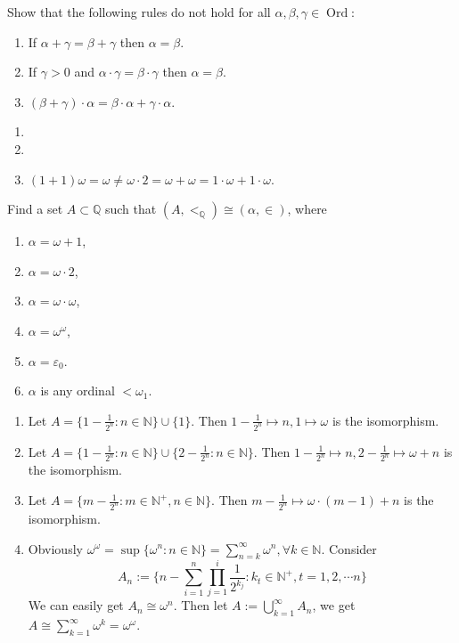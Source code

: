 \documentclass{ctexart}
\DeclareMathOperator{\ord}{Ord}
\newcommand{\N}{\mathbb{N}}
\begin{document}
\begin{problem}
 Show that the following rules do not hold for all $\alpha, \beta, \gamma \in\ord$:
 \begin{enumerate}[label=\alph*,ref=\theproblem.\alph*]
  \item If $\alpha+\gamma=\beta+\gamma$ then $\alpha=\beta$.
  \item If $\gamma>0$ and $\alpha \cdot \gamma=\beta \cdot \gamma$ then $\alpha=\beta$.
  \item $(\beta+\gamma) \cdot \alpha=\beta \cdot \alpha+\gamma \cdot \alpha$.
 \end{enumerate}
\end{problem}
 
 \begin{solution}
  \begin{enumerate}[label=\alph*,ref=\theproblem.\alph*]
   \item {}
   \item {}
   \item $(1+1)\omega=\omega\neq \omega\cdot 2=\omega+\omega=1\cdot \omega+1\cdot \omega$.
  \end{enumerate}
 \end{solution}
 
 \begin{problem}
 Find a set $A \subset \mathbb{Q}$ such that $\left(A,<_{\mathbb{Q}}\right) \cong(\alpha, \in)$, where
 \begin{enumerate}[label=\alph*,ref=\theproblem.\alph*]
 \item  $\alpha=\omega+1$,
 \item  $\alpha=\omega \cdot 2$,
 \item  $\alpha=\omega \cdot \omega$,
 \item  $\alpha=\omega^\omega$,
 \item  $\alpha=\varepsilon_0$.
 \item  $\alpha$ is any ordinal $<\omega_1$.
 \end{enumerate}
 \end{problem}
 
 \begin{solution}
  \begin{enumerate}[label=\alph*,ref=\theproblem.\alph*]
   \item Let $A=\{1-\frac{1}{2^n}:n\in\N\}\cup\{1\}$. Then $1-\frac{1}{2^n}\mapsto n,1\mapsto \omega$ is the isomorphism. 
   \item Let $A=\{1-\frac{1}{2^n}:n\in\N\}\cup\{2-\frac{1}{2^n}:n\in\N\}$. Then $1-\frac{1}{2^n}\mapsto n,2-\frac{1}{2^n}\mapsto \omega+n$ is the isomorphism. 
   \item Let $A=\{m-\frac{1}{2^n}:m\in\N^+,n\in\N\}$. Then $m-\frac{1}{2^n}\mapsto \omega\cdot(m-1)+n$ is the isomorphism. 
   \item Obviously $\omega^\omega=\sup\{\omega^n:n\in\N\}=\sum_{n=k}^\infty \omega^n,\forall k\in \N$. 
   Consider 
   $$A_n:=\{n-\sum_{i=1}^n\prod_{j=1}^i \frac{1}{2^{k_j}}:k_t\in\N^+,t=1,2,\cdots n\}$$
    We can easily get $A_n\cong \omega^n$. 
    Then let $A:=\bigcup_{k=1}^\infty A_n$, we get $A\cong \sum_{k=1}^\infty \omega^k =\omega^\omega$. 
  \end{enumerate}
 \end{solution}
 
\end{document}
